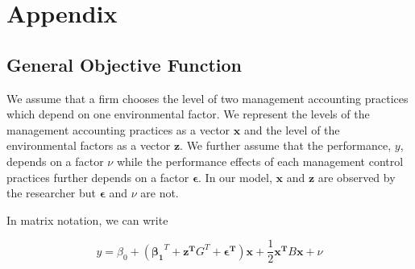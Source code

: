 \documentclass[12pt]{article}
\begin{document}
\pagebreak
 
\appendix
\renewcommand{\theequation}{A.\arabic{equation}}
\setcounter{equation}{0}

\section{Appendix}\label{appendix}
\subsection{General Objective Function}\label{appendix-general}

We assume that a firm chooses the level of two management accounting practices which depend on one environmental factor. We represent the levels of the management accounting practices as a vector $\mathbf{x}$ and the level of the environmental factors as a vector $\mathbf{z}$. We further assume that the performance, $y$, depends on a factor $\nu$ while the performance effects of each management control practices further depends on a factor $\mathbf{\epsilon}$. In our model, $\mathbf{x}$ and $\mathbf{z}$ are observed by the researcher but $\mathbf{\epsilon}$ and $\nu$ are not. 


In matrix notation, we can write

\begin{equation} \label{eq:structural-matrix}
y = \beta_0 + (\mathbf{\beta_1}^T + \mathbf{z^T} G^T + \mathbf{\epsilon^T})
     \mathbf{x} + \frac{1}{2}\mathbf{x^T} B \mathbf{x} + \nu
\end{equation}
\end{document}
